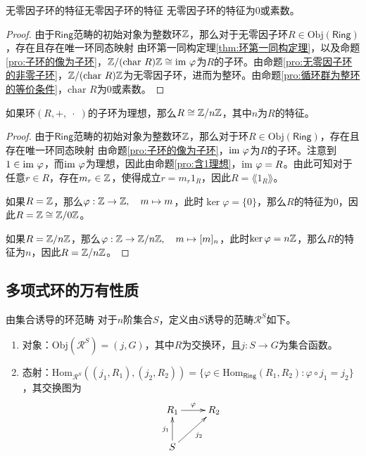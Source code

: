 \begin{proposition}{无零因子环的特征}{无零因子环的特征}
	无零因子环的特征为$0$或素数。
\end{proposition}

\begin{proof}
	由于$\mathsf{Ring}$范畴的初始对象为整数环$\mathbb{Z}$，那么对于无零因子环$R\in \mathrm{Obj}(\mathsf{Ring})$，存在且存在唯一环同态映射
	由环第一同构定理\ref{thm:环第一同构定理}，以及命题\ref{pro:子环的像为子环}，$\mathbb{Z}/(\text{char }R)\mathbb{Z}\cong \text{im } \varphi$为$R$的子环。由命题\ref{pro:无零因子环的非零子环}，$\mathbb{Z}/(\text{char }R)\mathbb{Z}$为无零因子环，进而为整环。由命题\ref{pro:循环群为整环的等价条件}，$\text{char }R$为$0$或素数。
\end{proof}

\begin{proposition}
	如果环$(R,+,\;\cdot\;)$的子环为理想，那么$R\cong \mathbb{Z}/n\mathbb{Z}$，其中$n$为$R$的特征。
\end{proposition}

\begin{proof}
	由于$\mathsf{Ring}$范畴的初始对象为整数环$\mathbb{Z}$，那么对于环$R\in \mathrm{Obj}(\mathsf{Ring})$，存在且存在唯一环同态映射
	由命题\ref{pro:子环的像为子环}，$\text{im } \varphi$为$R$的子环。注意到$1\in\text{im } \varphi$，而$\text{im } \varphi$为理想，因此由命题\ref{pro:含1理想}，$\text{im } \varphi=R$。由此可知对于任意$r\in R$，存在$m_r\in\mathbb{Z}$，使得成立$r=m_r1_R$，因此$R=\lang 1_R\rang$。
	
	如果$R=\mathbb{Z}$，那么$\varphi:\mathbb{Z}\to\mathbb{Z},\quad m\mapsto m$，此时$\ker\varphi=\{ 0 \}$，那么$R$的特征为$0$，因此$R=\mathbb{Z}\cong\mathbb{Z}/0\mathbb{Z}$。
	
	如果$R=\mathbb{Z}/n\mathbb{Z}$，那么$\varphi:\mathbb{Z}\to \mathbb{Z}/n\mathbb{Z},\quad m\mapsto [m]_{n}$，此时$\ker\varphi=n\mathbb{Z}$，那么$R$的特征为$n$，因此$R=\mathbb{Z}/n\mathbb{Z}$。
\end{proof}

\subsection{多项式环的万有性质}

\begin{definition}{由集合诱导的环范畴}
	对于$n$阶集合$S$，定义由$S$诱导的范畴$\mathscr{R}^{S}$如下。
	\begin{enumerate}
		\item 对象：$\mathrm{Obj}(\mathscr{R}^S)=(j,G)$，其中$R$为交换环，且$j:S\to G$为集合函数。
		\item 态射：$\mathrm{Hom}_{\mathscr{R}^S}((j_1,R_1),(j_2,R_2))=\{ \varphi\in\mathrm{Hom}_{\mathsf{Ring}}(R_1,R_2): \varphi\circ j_1=j_2 \}$，其交换图为
		$$
		\xymatrix{
			R_1 \ar[r]^{\varphi} & R_2\\
			S \ar[u]^{j_1} \ar[ur]_{j_2}
		}
		$$
	\end{enumerate}
\end{definition}

